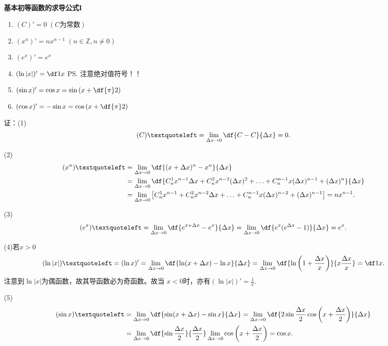 \begin{thx}
	{\bf 基本初等函数的求导公式I}
	\begin{enumerate}[(1)]
	  \item $(C)'=0\;(C\mbox{为常数})$ 
	  \item $(x^n)'=nx^{n-1}\;(n\in\mathbb{Z},n\ne
	  0)$ 
	  \item $(e^x)'=e^x$ 
	  \item $(\ln|x|)'=\df1x$ \ps{注意绝对值符号！！}
	  \item $(\sin x)'=\cos x=\sin\left(x+\df{\pi}2\right)$
	  \item $(\cos x)'=-\sin x=\cos\left(x+\df{\pi}2\right)$
	\end{enumerate}
\end{thx}

证：(1)
\begin{align*}
	(C)‘=\lim\limits_{\Delta x\to0}\df{C-C}{\Delta x}=0.
\end{align*}

(2)
\begin{align*}
	(x^n)‘
	&=\lim\limits_{\Delta x\to0}\df{(x+\Delta x)^n-x^n}{\Delta x}\\
	&=\lim\limits_{\Delta x\to0}
	\df{C_n^1x^{n-1}\Delta x+C_n^2x^{n-2}(\Delta x)^2+\ldots
	+C_{n}^{n-1}x(\Delta x)^{n-1}+(\Delta x)^n}{\Delta x}\\
	&=\lim\limits_{\Delta x\to0}\left[C_n^1x^{n-1}
	+C_n^2x^{n-2}\Delta x+\ldots
	+C_{n}^{n-1}x(\Delta x)^{n-2}+(\Delta x)^{n-1}\right]
	=nx^{n-1}.
\end{align*}

(3)
\begin{align*}
	(e^x)‘=\lim\limits_{\Delta x\to0}
	\df{e^{x+\Delta x}-e^x}{\Delta x}
	=\lim\limits_{\Delta x\to0}\df{e^x(e^{\Delta x}-1)}{\Delta x}
	=e^x.
\end{align*}

(4)若$x>0$
\begin{align*}
	(\ln |x|)‘=(\ln x)'=\lim\limits_{\Delta x\to0}
	\df{\ln(x+\Delta x)-\ln x}{\Delta x}
	=\lim\limits_{\Delta x\to0}
	\df{\ln\left(1+\frac{\Delta x}x\right)}{x\frac{\Delta x}x}
	=\df1x.
\end{align*}
注意到$\ln|x|$为偶函数，故其导函数必为奇函数。故当
$x<0$时，亦有$(\ln|x|)'=\frac 1x$.

(5)
\begin{align*}
	(\sin x)‘
	&=\lim\limits_{\Delta x\to0}
	\df{\sin(x+\Delta x)-\sin x}{\Delta x}
	=\lim\limits_{\Delta x\to0}
	\df{2\sin\frac{\Delta x}2\cos\left(x+\frac{\Delta x}2\right)}{\Delta x}\\
	&=\lim\limits_{\Delta x\to0}
	\df{\sin\frac{\Delta x}2}{\frac{\Delta x}2}
	\lim\limits_{\Delta x\to0}
	\cos\left(x+\frac{\Delta x}2\right)
	=\cos x.
\end{align*}

